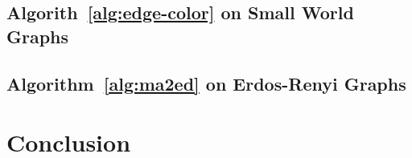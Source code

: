 \documentclass[conference, 10pt, letter]{IEEEtran}
\begin{document}
\subsection{Algorith~\ref{alg:edge-color} on Small World Graphs}

\subsection{Algorithm~\ref{alg:ma2ed} on Erdos-Renyi Graphs}
\label{sub:experiment-erdren-direct}

\section{Conclusion}



\end{document}
